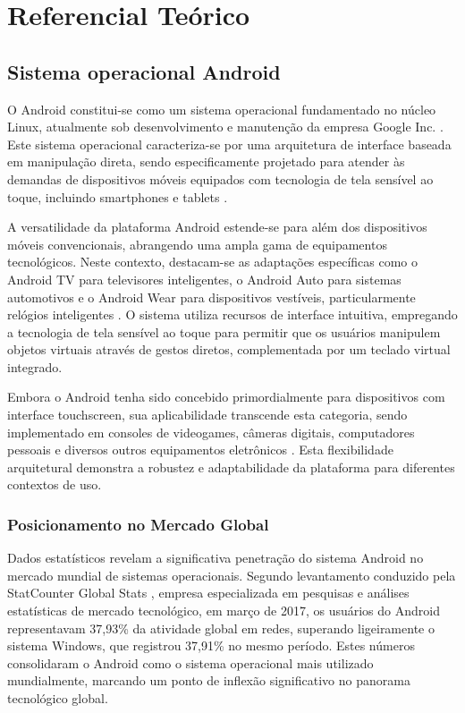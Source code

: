 \chapter{Referencial Teórico}\label{sec:RefTeorico}
\section{Sistema operacional Android}

O Android constitui-se como um sistema operacional fundamentado no núcleo Linux, atualmente sob desenvolvimento e manutenção da empresa Google Inc. \cite{google2023}. Este sistema operacional caracteriza-se por uma arquitetura de interface baseada em manipulação direta, sendo especificamente projetado para atender às demandas de dispositivos móveis equipados com tecnologia de tela sensível ao toque, incluindo smartphones e tablets \cite{burnette2021}.

A versatilidade da plataforma Android estende-se para além dos dispositivos móveis convencionais, abrangendo uma ampla gama de equipamentos tecnológicos. Neste contexto, destacam-se as adaptações específicas como o Android TV para televisores inteligentes, o Android Auto para sistemas automotivos e o Android Wear para dispositivos vestíveis, particularmente relógios inteligentes \cite{ableson2022}. O sistema utiliza recursos de interface intuitiva, empregando a tecnologia de tela sensível ao toque para permitir que os usuários manipulem objetos virtuais através de gestos diretos, complementada por um teclado virtual integrado.

Embora o Android tenha sido concebido primordialmente para dispositivos com interface touchscreen, sua aplicabilidade transcende esta categoria, sendo implementado em consoles de videogames, câmeras digitais, computadores pessoais e diversos outros equipamentos eletrônicos \cite{murphy2023}. Esta flexibilidade arquitetural demonstra a robustez e adaptabilidade da plataforma para diferentes contextos de uso.

\subsection{Posicionamento no Mercado Global}

Dados estatísticos revelam a significativa penetração do sistema Android no mercado mundial de sistemas operacionais. Segundo levantamento conduzido pela StatCounter Global Stats \cite{statcounter2017}, empresa especializada em pesquisas e análises estatísticas de mercado tecnológico, em março de 2017, os usuários do Android representavam 37,93\% da atividade global em redes, superando ligeiramente o sistema Windows, que registrou 37,91\% no mesmo período. Estes números consolidaram o Android como o sistema operacional mais utilizado mundialmente, marcando um ponto de inflexão significativo no panorama tecnológico global.

